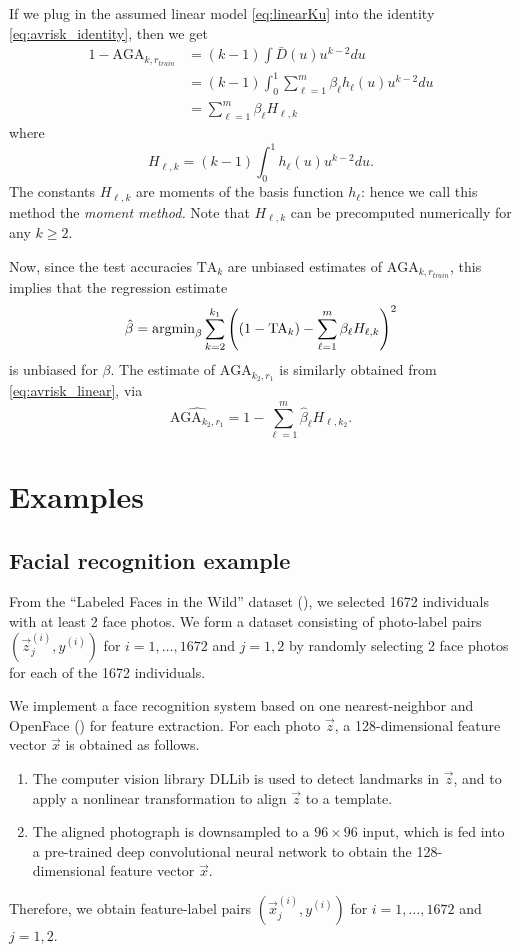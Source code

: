 \documentclass[12pt]{article}
\begin{document}
If we plug in the assumed linear model \eqref{eq:linearKu} into the
identity \eqref{eq:avrisk_identity}, then we get
\begin{align}
1 - \text{AGA}_{k, r_{train}} &= (k-1)\int \bar{D}(u) u^{k-2} du
\\&= (k-1)\int_0^1 \sum_{\ell = 1}^m \beta_\ell h_\ell(u) u^{k-2} du
\\&= \sum_{\ell = 1}^m \beta_\ell H_{\ell,k} \label{eq:avrisk_linear}
\end{align}
where
\begin{equation}
H_{\ell,k} = (k-1) \int_0^1 h_\ell(u) u^{k-2} du.
\end{equation}
The constants $H_{\ell, k}$ are moments of the basis function
$h_\ell$: hence we call this method the \emph{moment method.}  Note
that $H_{\ell, k}$ can be precomputed numerically for any $k \geq 2$.


Now, since the test accuracies $\text{TA}_k$ are unbiased estimates of
$\text{AGA}_{k, r_{train}}$, this implies that the regression
estimate
\[
\hat{\beta} = \text{argmin}_\beta \sum_{k=2}^{k_1} \left( (1 - \text{TA}_k) - \sum_{\ell=1}^m \beta_\ell H_{\ell, k}\right)^2
\]
is unbiased for $\beta$.
The estimate of $\text{AGA}_{k_2,r_1}$ is similarly obtained
from \eqref{eq:avrisk_linear}, via
\begin{equation}\label{eq:avrisk_hat}
\widehat{\text{AGA}_{k_2,r_1}} = 1 - \sum_{\ell=1}^m \hat{\beta}_\ell H_{\ell, k_2}.
\end{equation}


\section{Examples}\label{sec:extrapolation_example}

\subsection{Facial recognition example}

From the ``Labeled Faces in the Wild'' dataset (\cite{LFWTech}), we
selected 1672 individuals with at least 2 face photos.  We form a
dataset consisting of photo-label pairs $(\vec{z}_j^{(i)}, y^{(i)})$
for $i = 1,\hdots, 1672$ and $j = 1,2$ by randomly selecting 2 face
photos for each of the 1672 individuals.

We implement a face recognition system based on one nearest-neighbor
and OpenFace (\cite{amos2016openface}) for feature extraction.  For
each photo $\vec{z}$, a 128-dimensional feature vector $\vec{x}$ is
obtained as follows.
\begin{enumerate}
\item The computer vision library DLLib is used to detect landmarks in
  $\vec{z}$, and to apply a nonlinear transformation to align
  $\vec{z}$ to a template.
\item The aligned photograph is downsampled to a $96 \times 96$ input,
  which is fed into a pre-trained deep convolutional neural network to
  obtain the 128-dimensional feature vector $\vec{x}$.
\end{enumerate}
Therefore, we obtain feature-label pairs $(\vec{x}_j^{(i)}, y^{(i)})$
for $i = 1,\hdots, 1672$ and $j = 1,2$.
\end{document}
